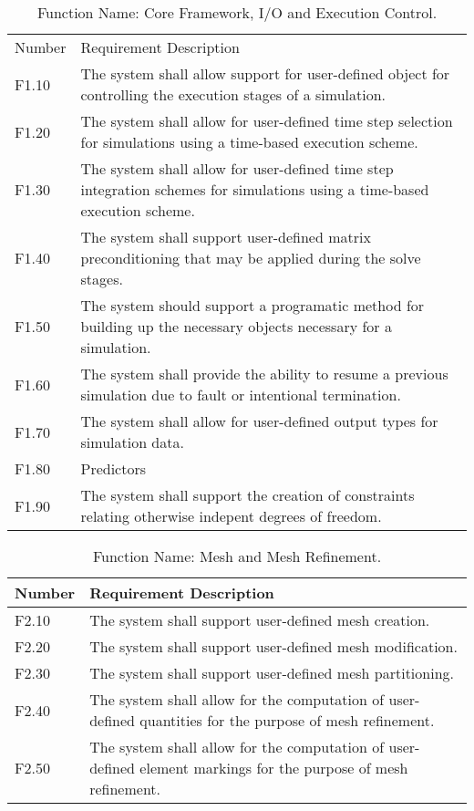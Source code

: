 \documentclass{INLreport}
\begin{document}
\begin{table}[!htbp]
  \caption{Function Name: Core Framework, I/O and Execution Control.\label{tab:core}}
  \setcounter{MyFirstTableCounter}{1}
  \begin{tabular}{|l|p{12cm}|}
    \rowcolor{gray}
    Number & Requirement Description \\
    F1.10 & The system shall allow support for user-defined object for controlling the execution stages of a simulation. \\ \hline
    F1.20 & The system shall allow for user-defined time step selection for simulations using a time-based execution scheme. \\ \hline
    F1.30 & The system shall allow for user-defined time step integration schemes for simulations using a time-based execution scheme. \\ \hline
    F1.40 & The system shall support user-defined matrix preconditioning that may be applied during the solve stages. \\ \hline
    F1.50 & The system should support a programatic method for building up the necessary objects necessary for a simulation. \\ \hline
    F1.60 & The system shall provide the ability to resume a previous simulation due to fault or intentional termination. \\ \hline
    F1.70 & The system shall allow for user-defined output types for simulation data. \\ \hline
    F1.80 & Predictors \\ \hline
    F1.90 & The system shall support the creation of constraints relating otherwise indepent degrees of freedom. \\ \hline
  \end{tabular}
\end{table}

\begin{table}[!htbp]
  \caption{Function Name: Mesh and Mesh Refinement.\label{tab:core}}
  \setcounter{MySecondTableCounter}{1}
  \begin{tabular}{|l|p{12cm}|}
    \rowcolor{gray}
    Number & Requirement Description \\ \hline
    F2.10 & The system shall support user-defined mesh creation. \\ \hline
    F2.20 & The system shall support user-defined mesh modification. \\ \hline
    F2.30 & The system shall support user-defined mesh partitioning. \\ \hline
    F2.40 & The system shall allow for the computation of user-defined quantities for the purpose of mesh refinement. \\ \hline
    F2.50 & The system shall allow for the computation of user-defined element markings for the purpose of mesh refinement. \\ \hline
  \end{tabular}
\end{table}
\end{document}
